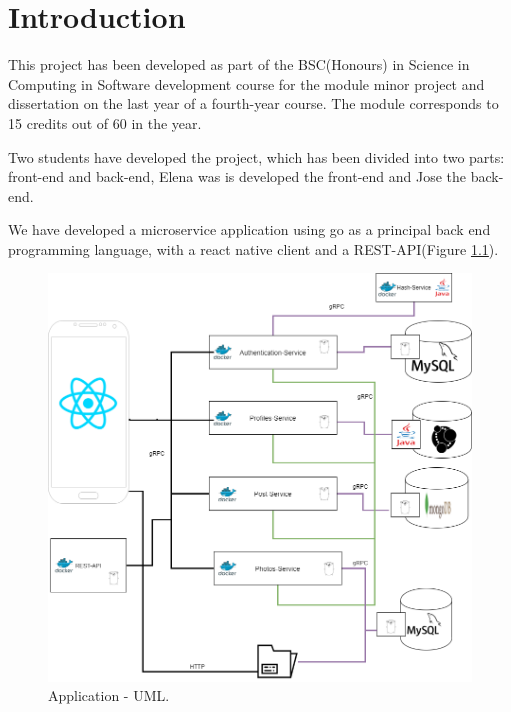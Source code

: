 \chapter{Introduction}
\vskip 0.1in
\indent
\indent

This project has been developed as part of the BSC(Honours) in Science in Computing in Software development course for the module minor project and dissertation on the last year of a fourth-year course. The module corresponds to 15 credits out of 60 in the year. 

Two students have developed the project, which has been divided into two parts: front-end and back-end, Elena was is developed the front-end and Jose the back-end.

We have developed a microservice application using go as a principal back end programming language, with a react native client and a REST-API(Figure \ref{application:uml}).
\begin{figure}
	\begin{center}
		\includegraphics[width=120mm,scale=1]{img/main-uml.png}
		\caption{Application -  UML.}
		\label{application:uml}
	\end{center}
\end{figure}

